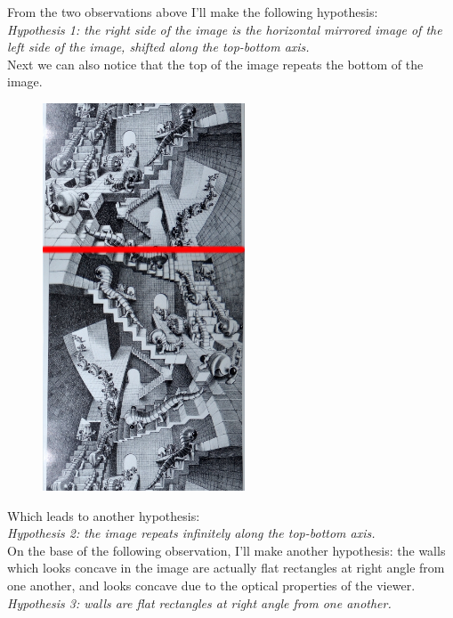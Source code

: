 \documentclass[12pt, a4paper]{article}
\begin{document}
From the two observations above I'll make the following hypothesis:\\

\emph{Hypothesis 1: the right side of the image is the horizontal mirrored image of the left side of the image, shifted along the top-bottom axis.}\\

Next we can also notice that the top of the image repeats the bottom of the image.\\

\begin{center}
\begin{figure}[H]
\centering\includegraphics[width=6cm]{./mirror3.png}\\
\end{figure}
\end{center}

Which leads to another hypothesis:\\

\emph{Hypothesis 2: the image repeats infinitely along the top-bottom axis.}\\

On the base of the following observation, I'll make another hypothesis: the walls which looks concave in the image are actually flat rectangles at right angle from one another, and looks concave due to the optical properties of the viewer.\\

\emph{Hypothesis 3: walls are flat rectangles at right angle from one another.}\\
\end{document}
